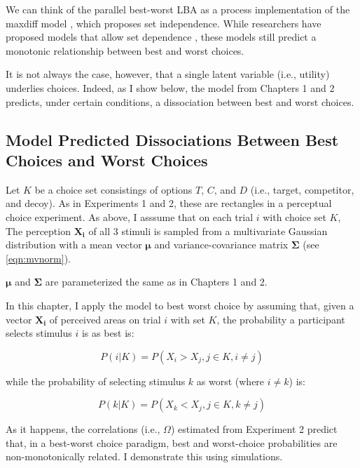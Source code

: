 We can think of the parallel best-worst LBA as a process implementation of the maxdiff model \parencite{hawkinsIntegratingCognitiveProcess2014a}, which proposes set independence. While researchers have proposed models that allow set dependence \parencite{marleyProbabilisticModelsSetdependent2008}, these models still predict a monotonic relationship between best and worst choices. 

It is not always the case, however, that a single latent variable (i.e., utility) underlies choices. Indeed, as I show below, the model from Chapters 1 and 2 predicts, under certain conditions, a dissociation between best and worst choices.

\subsection{Model Predicted Dissociations Between Best Choices and Worst Choices}

Let $K$ be a choice set consistings of options $T$, $C$, and $D$ (i.e., target, competitor, and decoy). As in Experiments 1 and 2, these are rectangles in a perceptual choice experiment. As above, I asssume that on each trial $i$ with choice set $K$, The perception $\mathbf{X_i}$ of all 3 stimuli is sampled from a multivariate Gaussian distribution with a mean vector $\boldsymbol{\mu}$ and variance-covariance matrix $\boldsymbol{\Sigma}$ (see \ref{eqn:mvnorm}).

$\boldsymbol{\mu}$ and $\boldsymbol{\Sigma}$ are parameterized the same as in Chapters 1 and 2. 

In this chapter, I apply the model to best worst choice by assuming that, given a vector $\mathbf{X_{i}}$ of perceived areas on trial $i$ with set $K$, the probability a participant selects stimulus $i$ is as best is:

\begin{equation}
   P(i|K)=P(X_{i}>X_{j}, j \in K, i \neq j)
   \label{eqn:bchoice1}
\end{equation}

while the probability of selecting stimulus $k$ as worst (where $i \neq k$) is:

\begin{equation}
   P(k|K)=P(X_{k}<X_{j}, j \in K, k \neq j)
   \label{eqn:wchoice1}
\end{equation}

As it happens, the correlations (i.e., $\Omega$) estimated from Experiment 2 predict that, in a best-worst choice paradigm, best and worst-choice probabilities are non-monotonically related. I demonstrate this using simulations.

